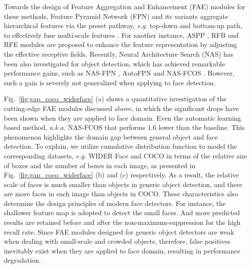\documentclass[sigconf]{acmart}
\begin{document}
Towards the design of Feature Aggregation and Enhancement (FAE) modules for these methods, Feature Pyramid Network (FPN) and its variants aggregate hierarchical features via the preset pathway, \textit{e.g.} top-down and bottom-up path, to effectively fuse multi-scale features \cite{tang2018pyramidbox,tan2020efficientdet,liu2018pafpn,li2019dsfd,zhang2020acfd}. For another instance, ASPP \cite{chen2017aspp,qiao2020detectors}, RFB \cite{liu2018rfb} and RFE \cite{deng2019retinaface} modules are proposed to enhance the feature representation by adjusting the effective receptive fields. Recently, Neural Architecture Search (NAS) has been also investigated for object detection, which has achieved remarkable performance gains, such as NAS-FPN \cite{ghiasi2019nasfpn}, AutoFPN \cite{xu2019autofpn} and NAS-FCOS \cite{wang2019nasfcos}. However, such a gain is severely not generalized when applying to face detection.

Fig.~\ref{fig:gap_coco_widerface} (a) shows a quantitative investigation of the cutting-edge FAE modules discussed above, in which the significant drops have been shown when they are applied to face domain. Even the automatic learning based method, \textit{a.k.a.} NAS-FCOS \cite{wang2019nasfcos} that performs $1.6$ lower than the baseline. This phenomenon highlights the domain gap between general object and face detection. To explain, we utilize cumulative distribution function to model the corresponding datasets, \textit{e.g.} WIDER Face \cite{yang2016wider} and COCO \cite{lin2014coco} in terms of the relative size of boxes and the number of boxes in each image, as presented in Fig.~\ref{fig:gap_coco_widerface} (b) and (c) respectively. As a result, the relative scale of faces is much smaller than objects in generic object detection, and there are more faces in each image than objects in COCO.
These characteristics also determine the design principles of modern face detectors. For instance, the shallower feature map is adopted to detect the small faces. And more predicted results are retained before and after the non-maximum-suppression for the high recall rate. Since FAE modules designed for generic object detectors are weak when dealing with small-scale and crowded objects, therefore, false positives inevitably exist when they are applied to face domain, resulting in performance degradation.
\end{document}
